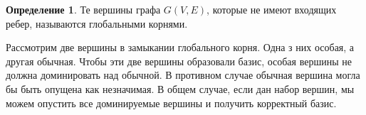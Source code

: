 \documentclass[12pt,a4paper,oneside]{article}
\theoremstyle{definition}
\newtheorem{definition}{Определение}[]
\theoremstyle{lemma}
\theoremstyle{remark}
\begin{document}
\begin{definition}
Те вершины графа $G(V,E)$, которые не имеют входящих ребер, называются глобальными корнями.
\end{definition}

Рассмотрим две вершины в замыкании глобального корня. Одна з них особая, а другая обычная. Чтобы эти две вершины образовали базис, особая вершины не должна доминировать над обычной. В противном случае обычная вершина могла бы быть опущена как незначимая. В общем случае, если дан набор вершин, мы можем опустить все доминируемые вершины и получить корректный базис.

\begin{figure}[H]
	\begin{center}
		\begin{algorithm}[H]
			\SetAlgoLined


\end{algorithm}
\end{center}
\end{figure}
\end{document}
